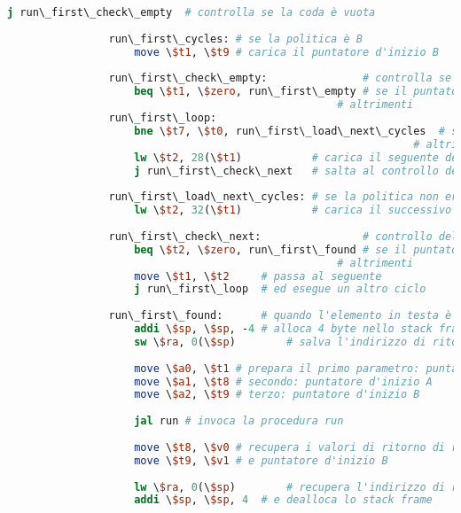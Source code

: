 \begin{center}
\begin{lstlisting}[language=mips, gobble=14, stepnumber=1]
                    j run\_first\_check\_empty	# controlla se la coda è vuota
                    
                run\_first\_cycles:	# se la politica è B
                    move \$t1, \$t9	# carica il puntatore d'inizio B
                    
                run\_first\_check\_empty:				# controlla se la coda è vuota
                    beq \$t1, \$zero, run\_first\_empty	# se il puntatore d'inizio è nullo, la coda è vuota
                									# altrimenti
                run\_first\_loop:
                    bne \$t7, \$t0, run\_first\_load\_next\_cycles	# se la politica non è A, carica il seguente della lista B
                												# altrimenti
                    lw \$t2, 28(\$t1)			# carica il seguente della lista A
                    j run\_first\_check\_next	# salta al controllo dell'elemento successivo
                    
                run\_first\_load\_next\_cycles:	# se la politica non era A
                    lw \$t2, 32(\$t1)			# carica il successivo della lista B
                    
                run\_first\_check\_next:				# controllo dell'elemento successivo
                    beq \$t2, \$zero, run\_first\_found	# se il puntatore all'elemento seguente è nullo, allora il task in testa è stato trovato
                									# altrimenti
                    move \$t1, \$t2		# passa al seguente
                    j run\_first\_loop	# ed esegue un altro ciclo
                
                run\_first\_found:		# quando l'elemento in testa è trovato
                    addi \$sp, \$sp, -4	# alloca 4 byte nello stack frame (1 word)
                    sw \$ra, 0(\$sp)		# salva l'indirizzo di ritorno nello stack
                    
                    move \$a0, \$t1	# prepara il primo parametro: puntatore al task in testa alla coda
                    move \$a1, \$t8	# secondo: puntatore d'inizio A
                    move \$a2, \$t9	# terzo: puntatore d'inizio B
                    
                    jal run	# invoca la procedura run
                    
                    move \$t8, \$v0	# recupera i valori di ritorno di run: puntatore d'inizio A
                    move \$t9, \$v1	# e puntatore d'inizio B
                    
                    lw \$ra, 0(\$sp)		# recupera l'indirizzo di ritorno al chiamante dallo stack
                    addi \$sp, \$sp, 4	# e dealloca lo stack frame
                

\end{lstlisting}
\end{center}
